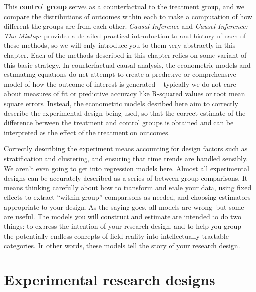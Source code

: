 This \textbf{control group} serves as a counterfactual to the treatment group,
and we compare the distributions of outcomes within each
to make a computation of how different the groups are from each other.
\textit{Causal Inference} and \textit{Causal Inference: The Mixtape}
provides a detailed practical introduction to and history of
each of these methods, so we will only introduce you to
them very abstractly in this chapter.
Each of the methods described in this chapter
relies on some variant of this basic strategy.
In counterfactual causal analysis,
the econometric models and estimating equations
do not attempt to create a predictive or comprehensive model
of how the outcome of interest is generated --
typically we do not care about measures of fit or predictive accuracy
like R-squared values or root mean square errors.
Instead, the econometric models desribed here aim to
correctly describe the experimental design being used,
so that the correct estimate of the difference
between the treatment and control groups is obtained
and can be interpreted as the effect of the treatment on outcomes.

Correctly describing the experiment means accounting for design factors
such as stratification and clustering, and
ensuring that time trends are handled sensibly.
We aren't even going to get into regression models here.
Almost all experimental designs can be accurately described
as a series of between-group comparisons.
It means thinking carefully about how to transform and scale your data,
using fixed effects to extract ``within-group'' comparisons as needed,
and choosing estimators appropriate to your design.
As the saying goes, all models are wrong, but some are useful.
The models you will construct and estimate are intended to do two things:
to express the intention of your research design,
and to help you group the potentially endless concepts of field reality
into intellectually tractable categories.
In other words, these models tell the story of your research design.


\section{Experimental research designs}

